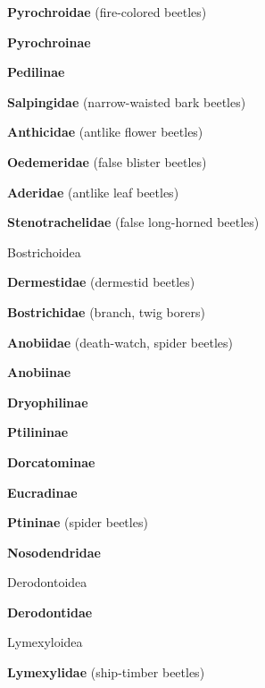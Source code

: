 \documentclass[letterpaper,10pt]{article}
\begin{document}
{\makebox[0.6cm]{}  \textbf{Pyrochroidae} (fire-colored beetles) \par
\makebox[0.8cm]{}  \textbf{Pyrochroinae} \par
\makebox[0.8cm]{}  \textbf{Pedilinae} \par
\makebox[0.6cm]{}  \textbf{Salpingidae} (narrow-waisted bark beetles) \par
\makebox[0.6cm]{}  \textbf{Anthicidae} (antlike flower beetles) \par
\makebox[0.6cm]{}  \textbf{Oedemeridae} (false blister beetles) \par
\makebox[0.6cm]{}  \textbf{Aderidae} (antlike leaf beetles) \par
\makebox[0.6cm]{}  \textbf{Stenotrachelidae} (false long-horned beetles) \par
\makebox[0.40cm]{}  Bostrichoidea \par
\makebox[0.6cm]{}  \textbf{Dermestidae} (dermestid beetles) \par
\makebox[0.6cm]{}  \textbf{Bostrichidae} (branch, twig borers) \par
\makebox[0.6cm]{}  \textbf{Anobiidae} (death-watch, spider beetles) \par
\makebox[0.8cm]{}  \textbf{Anobiinae} \par
\makebox[0.8cm]{}  \textbf{Dryophilinae} \par
\makebox[0.8cm]{}  \textbf{Ptilininae} \par
\makebox[0.8cm]{}  \textbf{Dorcatominae} \par
\makebox[0.8cm]{}  \textbf{Eucradinae} \par
\makebox[0.8cm]{}  \textbf{Ptininae} (spider beetles) \par
\makebox[0.6cm]{}  \textbf{Nosodendridae} \par
\makebox[0.40cm]{}  Derodontoidea \par
\makebox[0.6cm]{}  \textbf{Derodontidae} \par
\makebox[0.40cm]{}  Lymexyloidea \par
\makebox[0.6cm]{}  \textbf{Lymexylidae} (ship-timber beetles) \par
}
\end{document}
